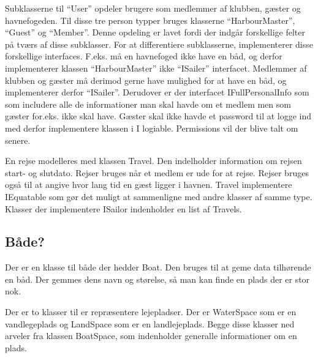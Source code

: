 Subklasserne til \enquote{User} opdeler brugere som medlemmer af klubben, gæster og havnefogeden. Til disse tre person typper bruges klasserne \enquote{HarbourMaster}, \enquote{Guest} og \enquote{Member}. Denne opdeling er lavet fordi der indgår forskellige felter på tværs af disse subklasser. For at differentiere subklasserne, implementerer disse forskellige interfaces. F.eks. må en havnefoged ikke have en båd, og derfor implementerer klassen \enquote{HarbourMaster} ikke \enquote{ISailer} interfacet. Medlemmer af klubben og gæster må derimod gerne have mulighed for at have en båd, og implementerer derfor \enquote{ISailer}. Derudover er der interfacet IFullPersonalInfo som som includere alle de informationer man skal havde om et medlem men som gæster for.eks. ikke skal have. Gæster skal ikke havde et password til at logge ind med derfor implementere klassen i I logiable. Permissions vil der blive talt om senere.

En rejse modelleres med klassen Travel. Den indelholder information om rejsen start- og slutdato. Rejser bruges når et medlem er ude for at rejse. Rejser bruges også til at angive hvor lang tid en gæst ligger i havnen. Travel implementere IEquatable som gør det muligt at sammenligne med andre klasser af samme type. Klasser der implementere ISailor indenholder en list af Travels.

\subsection{Både?}
\label{sub:bade}

Der er en klasse til både der hedder Boat. Den bruges til at geme data tilhørende en båd. Der gemmes dens navn og størelse, så man kan finde en plads der er stor nok.

Der er to klasser til er repræsentere lejepladser. Der er WaterSpace som er en vandlegeplads og LandSpace som er en landlejeplads. Begge disse klasser ned arveler fra klassen BoatSpace, som indenholder generalle informationer om en plads.

